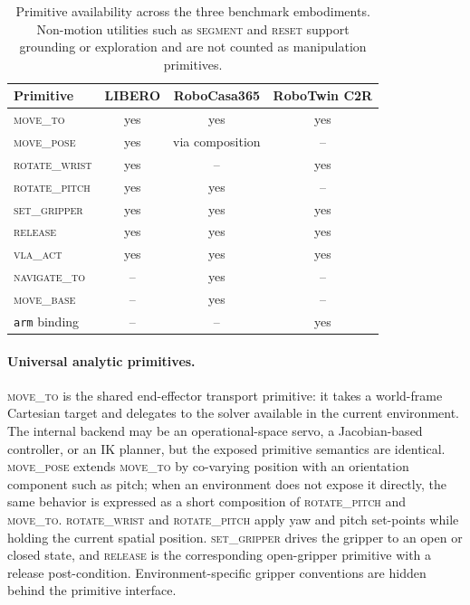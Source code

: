 \documentclass{article}
\begin{document}
\begin{table}[h]
\centering
\caption{Primitive availability across the three benchmark embodiments. Non-motion utilities such as \textsc{segment} and \textsc{reset} support grounding or exploration and are not counted as manipulation primitives.}
\label{tab:app_primitive_availability}
\small
\setlength{\tabcolsep}{5pt}
\begin{tabular}{lccc}
\toprule
Primitive & LIBERO & RoboCasa365 & RoboTwin C2R \\
\midrule
\textsc{move\_to}       & yes & yes & yes \\
\textsc{move\_pose}     & yes & via composition & -- \\
\textsc{rotate\_wrist}  & yes & -- & yes \\
\textsc{rotate\_pitch}  & yes & yes & -- \\
\textsc{set\_gripper}   & yes & yes & yes \\
\textsc{release}        & yes & yes & yes \\
\textsc{vla\_act}       & yes & yes & yes \\
\midrule
\textsc{navigate\_to}   & -- & yes & -- \\
\textsc{move\_base}     & -- & yes & -- \\
\texttt{arm} binding    & -- & -- & yes \\
\bottomrule
\end{tabular}
\end{table}

\paragraph{Universal analytic primitives.}
\textsc{move\_to} is the shared end-effector transport primitive: it takes a world-frame Cartesian target and delegates to the solver available in the current environment. The internal backend may be an operational-space servo, a Jacobian-based controller, or an IK planner, but the exposed primitive semantics are identical. \textsc{move\_pose} extends \textsc{move\_to} by co-varying position with an orientation component such as pitch; when an environment does not expose it directly, the same behavior is expressed as a short composition of \textsc{rotate\_pitch} and \textsc{move\_to}. \textsc{rotate\_wrist} and \textsc{rotate\_pitch} apply yaw and pitch set-points while holding the current spatial position. \textsc{set\_gripper} drives the gripper to an open or closed state, and \textsc{release} is the corresponding open-gripper primitive with a release post-condition. Environment-specific gripper conventions are hidden behind the primitive interface.
\end{document}
